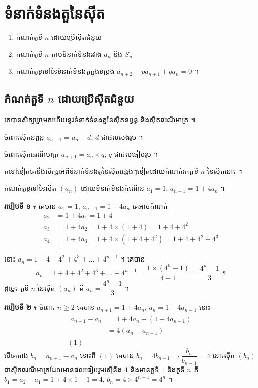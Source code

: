 \chapter{ទំនាក់ទំនងតួនៃស៊ីត}

\begin{objBox}[វត្ថុបំណង]
\begin{enumerate}[1]
  \item កំណត់តួទី $n$ ដោយប្រើស៊ីតជំនួយ
  \item កំណត់តួទី $n$ តាមទំនាក់ទំនងរវាង $a_n$ និង $S_n$
  \item កំណត់តួទូទៅនៃទំនាក់ទំនងតួក្នុងទម្រង់ $a_{n+2} + pa_{n+1} + qa_n = 0$ ។
\end{enumerate}
\end{objBox}

\section{កំណត់តួទី \texorpdfstring{$n$}{n} ដោយប្រើស៊ីតជំនួយ}

គេបានសិក្សារួចមកហើយនូវទំនាក់ទំនងតួនៃស៊ីតនព្វន្ត និងស៊ីតធរណីមាត្រ ។

ចំពោះស៊ីតនព្វន្ត $a_{n+1} = a_n + d$, $d$ ជាផលសងរួម ។

ចំពោះស៊ីតធរណីមាត្រ $a_{n+1} = a_n \times q$, $q$ ជាផលធៀបរួម ។

តទៅទៀតគេនឹងសិក្សាអំពីទំនាក់ទំនងតួនៃស៊ីតផ្សេងៗទៀតដោយកំណត់រកតួទី $n$ នៃស៊ីតនោះ ។

\begin{example}[លំហាត់គំរូ ១]
កំណត់តួទូទៅនៃស៊ីត $(a_n)$ ដោយទំនាក់ទំនងកំណើន $a_1 = 1$, $a_{n+1} = 1 + 4a_n$ ។
\end{example}
\ans
\textbf{របៀបទី ១} ៖ គេមាន $a_1 = 1$, $a_{n+1} = 1 + 4a_n$ គេអាចកំណត់
\[
\begin{aligned}
a_2 &= 1 + 4a_1 = 1 + 4\\
a_3 &= 1 + 4a_2 = 1 + 4 \times (1 + 4) = 1 + 4 + 4^2\\
a_4 &= 1 + 4a_3 = 1 + 4 \times (1 + 4 + 4^2) = 1 + 4 + 4^2 + 4^3\\
&\ \,\vdots
\end{aligned}
\]
នោះ $a_n = 1 + 4 + 4^2 + 4^3 + \ldots + 4^{n-1}$ ។ គេបាន
\[ a_n = 1 + 4 + 4^2 + 4^3 + \ldots + 4^{n-1} = \frac{1 \times (4^n - 1)}{4 - 1} = \frac{4^n - 1}{3} \text{ ។} \]
ដូច្នេះ តួទី $n$ នៃស៊ីត $(a_n)$ គឺ $a_n = \dfrac{4^n - 1}{3}$ ។

\textbf{របៀបទី ២} ៖ ចំពោះ $n \ge 2$ គេបាន $a_{n+1} = 1 + 4a_n$, $a_n = 1 + 4a_{n-1}$ នោះ
\[
\begin{gathered}
\begin{aligned}
a_{n+1} - a_n &= 1 + 4a_n - (1 + 4a_{n-1})\\
&= 4(a_n - a_{n-1})
\end{aligned}\\
(1)
\end{gathered}
\]
បើគេតាង $b_n = a_{n+1} - a_n$ នោះពី $(1)$ គេបាន $b_n = 4b_{n-1} \Rightarrow \dfrac{b_n}{b_{n-1}} = 4$ នោះស៊ីត $(b_n)$ ជាស៊ីតធរណីមាត្រដែលមានផលធៀបរួមស្មើនឹង $4$ និងមានតួទី $1$ និងតួទី $n$ គឺ $b_1 = a_2 - a_1 = 1 + 4 \times 1 - 1 = 4$, $b_n = 4 \times 4^{n-1} = 4^n$ ។

